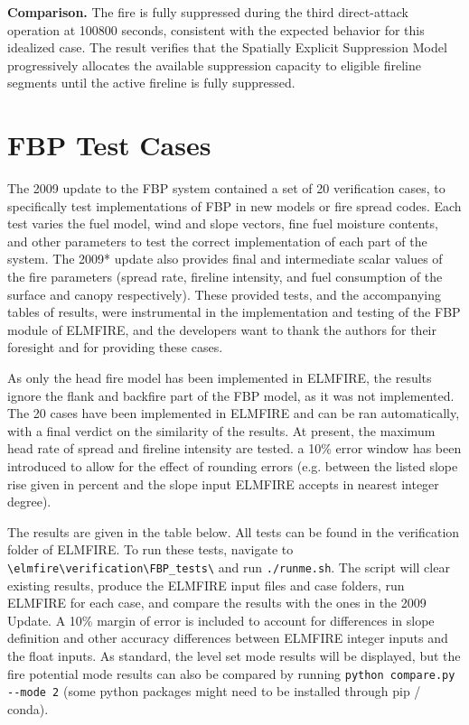 \textbf{Comparison.} The fire is fully suppressed during the third direct-attack operation at 100800 seconds, consistent with the expected behavior for this idealized case. The result verifies that the Spatially Explicit Suppression Model progressively allocates the available suppression capacity to eligible fireline segments until the active fireline is fully suppressed.











\section{FBP Test Cases}

The 2009 update to the FBP system \cite{wottonUpdatesRevisions19922009} contained a set of 20 verification cases, to specifically test implementations of FBP in new models or fire spread codes. Each test varies the fuel model, wind and slope vectors, fine fuel moisture contents, and other parameters to test the correct implementation of each part of the system. The 2009* update also provides final and intermediate scalar values of the fire parameters (spread rate, fireline intensity, and fuel consumption of the surface and canopy respectively). These provided tests, and the accompanying tables of results, were instrumental in the implementation and testing of the FBP module of ELMFIRE, and the developers want to thank the authors for their foresight and for providing these cases.

As only the head fire model has been implemented in ELMFIRE, the results ignore the flank and backfire part of the FBP model, as it was not implemented. The 20 cases have been implemented in ELMFIRE and can be ran automatically, with a final verdict on the similarity of the results. At present, the maximum head rate of spread and fireline intensity are tested. a 10\% error window has been introduced to allow for the effect of rounding errors (e.g. between the listed slope rise given in percent and the slope input ELMFIRE accepts in nearest integer degree). 

The results are given in the table below. All tests can be found in the verification folder of ELMFIRE. To run these tests, navigate to \verb|\elmfire\verification\FBP_tests\| and run \verb|./runme.sh|. The script will clear existing results, produce the ELMFIRE input files and case folders, run ELMFIRE for each case, and compare the results with the ones in the 2009 Update. A 10\% margin of error is included to account for differences in slope definition and other accuracy differences between ELMFIRE integer inputs and the float inputs. As standard, the level set mode results will be displayed, but the fire potential mode results can also be compared by running  \verb|python compare.py --mode 2| (some python packages might need to be installed through pip / conda).

